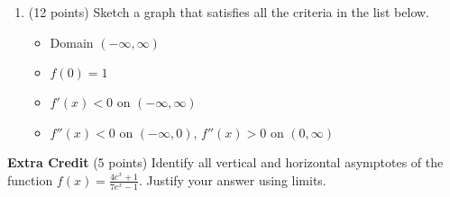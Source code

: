 \documentclass[12pt]{article}
\begin{document}
\begin{enumerate}
\vspace{1in}

\newpage
\item (12 points) Sketch a graph that satisfies all the criteria in the list below.\\

\begin{multicols}{2}
\begin{itemize}
\item Domain $(-\infty, \infty)$
\item $f(0)=1$
\item $f'(x) < 0$ on $(-\infty, \infty)$
\item $f''(x) < 0$ on $(-\infty, 0)$, $f''(x) > 0$ on $(0,\infty)$
\end{itemize}

\quad

\vspace{.3in}

\quad
 \columnbreak
 
\end{multicols}
\end{enumerate}



\textbf{Extra Credit} (5 points) Identify all vertical and horizontal asymptotes of the function $f(x)=\frac{4e^x+1}{7e^x-1}$. Justify your answer using limits.
\vfill
\end{document}
